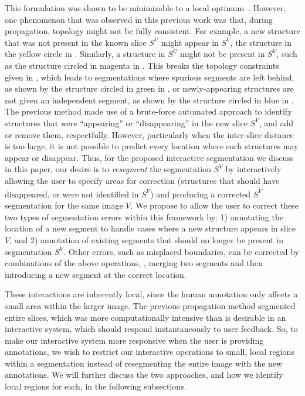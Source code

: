 \documentclass[]{spie}  %
\begin{document}
This formulation was shown to be minimizable to a local
optimum~\cite{veksler:99, boykov:01}.  However, one phenomenon that
was observed in this previous work was that, during propagation,
topology might not be fully consistent.  For example, a new structure
that was not present in the known slice $S^U$ might appear in $S^V$,
\eg the structure in the yellow circle in .  Similarly,
a structure in $S^U$ might not be present in $S^V$, such as the
structure circled in magenta in .  This breaks the
topology constraints given in , which leads to segmentations
where spurious segments are left behind, as shown by the structure
circled in green in , or newly-appearing structures are
not given an independent segment, as shown by the structure circled in
blue in .  The previous method made use of a brute-force
automated approach to identify structures that were ``appearing'' or
``disappearing'' in the new slice $S^V$, and add or remove them,
respectfully.  However, particularly when the inter-slice distance is
too large, it is not possible to predict every location where such
structures may appear or disappear.  Thus, for the proposed
interactive segmentation we discuss in this paper, our desire is to
\emph{resegment} the segmentation $S^V$ by interactively allowing the
user to specify areas for correction (\ie structures that should have
disappeared, or were not identified in $S^V$) and producing a
corrected $S^{\tilde{V}}$ segmentation for the same image $V$.  We
propose to allow the user to correct these two types of segmentation
errors within this framework by: 1) annotating the location of a new
segment to handle cases where a new structure appears in slice $V$,
and 2) annotation of existing segments that should no longer be
present in segmentation $S^V$.  %
Other errors, such as misplaced boundaries, can be corrected by
combinations of the above operations, \eg, merging two segments and
then introducing a new segment at the correct location.

These interactions are inherently local, since the human annotation
only affects a small area within the larger image.  The previous
propagation method segmented entire slices, which was more
computationally intensive than is desirable in an interactive system,
which should respond instantaneously to user feedback.  So, to make
our interactive system more responsive when the user is providing
annotations, we wish to restrict our interactive operations to small,
local regions within a segmentation instead of resegmenting the entire
image with the new annotations.  We will further discuss the two
approaches, and how we identify local regions for each, in the
following subsections.
\end{document}
